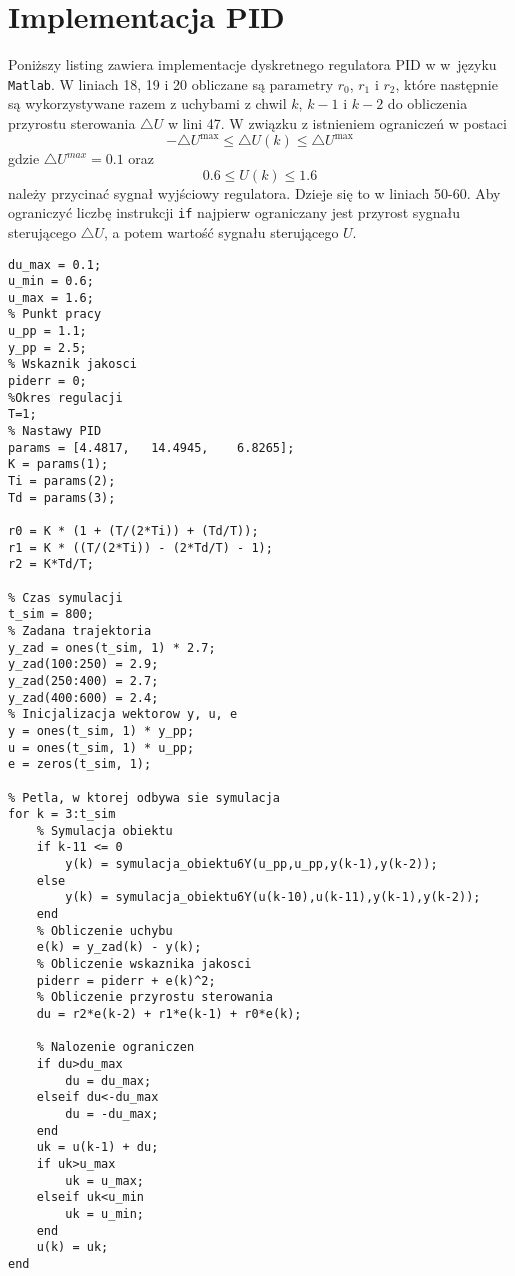 \chapter{Implementacja PID}
Poniższy listing zawiera implementacje dyskretnego regulatora PID w w~języku \verb+Matlab+. W liniach 18, 19 i 20 obliczane są parametry $r_0$, 
$r_1$ i $r_2$, które następnie są wykorzystywane razem z uchybami z chwil $k$, $k-1$ i $k-2$ do obliczenia przyrostu sterowania $\triangle{U}$ w lini 47. W związku z istnieniem ograniczeń w postaci
\begin{equation}
-\triangle U^{\mathrm{max}} \le \triangle U(k) \le \triangle U^{\mathrm{max}}
\end{equation}
gdzie $\triangle U^{max}=\num{0.1}$ oraz
\begin{equation}
\num{0.6} \le U(k) \le \num{1.6} 
\end{equation}
należy przycinać sygnał wyjściowy regulatora. Dzieje się to w liniach 50-60. Aby ograniczyć liczbę instrukcji \verb+if+ najpierw ograniczany jest przyrost sygnału sterującego $\triangle U$, a potem wartość sygnału sterującego $U$.
\begin{lstlisting}[style=Matlab-editor]
% Ograniczenia
du_max = 0.1;
u_min = 0.6;
u_max = 1.6;
% Punkt pracy
u_pp = 1.1;
y_pp = 2.5;
% Wskaznik jakosci
piderr = 0;
%Okres regulacji
T=1;
% Nastawy PID
params = [4.4817,   14.4945,    6.8265];
K = params(1);
Ti = params(2);
Td = params(3);

r0 = K * (1 + (T/(2*Ti)) + (Td/T));
r1 = K * ((T/(2*Ti)) - (2*Td/T) - 1);
r2 = K*Td/T;

% Czas symulacji
t_sim = 800;
% Zadana trajektoria
y_zad = ones(t_sim, 1) * 2.7;
y_zad(100:250) = 2.9;
y_zad(250:400) = 2.7;
y_zad(400:600) = 2.4;
% Inicjalizacja wektorow y, u, e
y = ones(t_sim, 1) * y_pp;
u = ones(t_sim, 1) * u_pp;
e = zeros(t_sim, 1);

% Petla, w ktorej odbywa sie symulacja
for k = 3:t_sim
    % Symulacja obiektu
    if k-11 <= 0
        y(k) = symulacja_obiektu6Y(u_pp,u_pp,y(k-1),y(k-2));
    else
        y(k) = symulacja_obiektu6Y(u(k-10),u(k-11),y(k-1),y(k-2));
    end
    % Obliczenie uchybu
    e(k) = y_zad(k) - y(k);
    % Obliczenie wskaznika jakosci
    piderr = piderr + e(k)^2;
    % Obliczenie przyrostu sterowania
    du = r2*e(k-2) + r1*e(k-1) + r0*e(k);
    
    % Nalozenie ograniczen
    if du>du_max
        du = du_max;
    elseif du<-du_max
        du = -du_max;
    end
    uk = u(k-1) + du;
    if uk>u_max
        uk = u_max;
    elseif uk<u_min
        uk = u_min;
    end
    u(k) = uk;
end
\end{lstlisting} 





